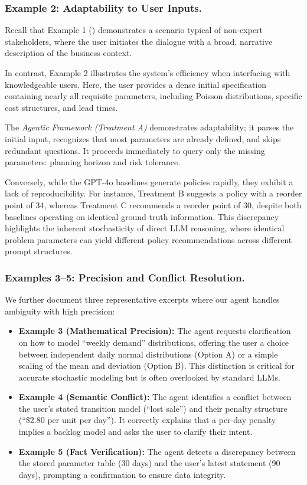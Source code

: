 \documentclass[mnsc,nonblindrev]{informs3_hide}
\begin{document}
\begin{APPENDICES}
\subsubsection{Example 2: Adaptability to User Inputs.}

Recall that Example 1 () demonstrates a scenario typical of non-expert stakeholders, where the user initiates the dialogue with a broad, narrative description of the business context.

In contrast, Example 2 illustrates the system's efficiency when interfacing with knowledgeable users. Here, the user provides a dense initial specification containing nearly all requisite parameters, including Poisson distributions, specific cost structures, and lead times.


The \textit{Agentic Framework (Treatment A)} demonstrates adaptability; it parses the initial input, recognizes that most parameters are already defined, and skips redundant questions. It proceeds immediately to query only the missing parameters: planning horizon and risk tolerance.

Conversely, while the GPT-4o baselines generate policies rapidly, they exhibit a lack of reproducibility. For instance, Treatment B suggests a policy with a reorder point of 34, whereas Treatment C recommends a reorder point of 30, despite both baselines operating on identical ground-truth information. This discrepancy highlights the inherent stochasticity of direct LLM reasoning, where identical problem parameters can yield different policy recommendations across different prompt structures.

\subsubsection{Examples 3--5: Precision and Conflict Resolution.}
We further document three representative excerpts where our agent handles ambiguity with high precision:
\begin{itemize}
    \item \textbf{Example 3 (Mathematical Precision):} The agent requests clarification on how to model ``weekly demand'' distributions, offering the user a choice between independent daily normal distributions (Option A) or a simple scaling of the mean and deviation (Option B). This distinction is critical for accurate stochastic modeling but is often overlooked by standard LLMs.
    \item \textbf{Example 4 (Semantic Conflict):} The agent identifies a conflict between the user's stated transition model (``lost sale'') and their penalty structure (``\$2.80 per unit per day''). It correctly explains that a per-day penalty implies a backlog model and asks the user to clarify their intent.
    \item \textbf{Example 5 (Fact Verification):} The agent detects a discrepancy between the stored parameter table (30 days) and the user's latest statement (90 days), prompting a confirmation to ensure data integrity.
\end{itemize}




\end{APPENDICES}
\end{document}
